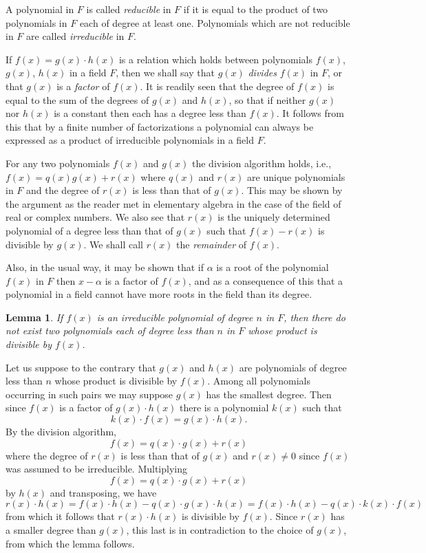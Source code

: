 \documentclass[10pt,leqno]{article}
\newtheorem*{lemm*}{Lemma}
\theoremstyle{definition}
\begin{document}
A polynomial in $F$ is called \emph{reducible} in $F$ if it is equal to the product of two polynomials in $F$ each of degree at least one.
Polynomials which are not reducible in $F$ are called \emph{irreducible} in $F$.

If $f(x) = g(x) \cdot h(x)$ is a relation which holds between polynomials $f(x)$, $g(x)$, $h(x)$ in a field $F$, then we shall say that $g(x)$ \emph{divides} $f(x)$ in $F$, or that $g(x)$ is a \emph{factor} of $f(x)$.
It is readily seen that the degree of $f(x)$ is equal to the sum of the degrees of $g(x)$ and $h(x)$, so that if neither $g(x)$ nor $h(x)$ is a constant then each has a degree less than $f(x)$.
It follows from this that by a finite number of factorizations a polynomial can always be expressed as a product of irreducible polynomials in a field $F$.

For any two polynomials $f(x)$ and $g(x)$ the division algorithm holds, i.e., $f(x) = q(x) g(x) + r(x)$ where $q(x)$ and $r(x)$ are unique polynomials in $F$ and the degree of $r(x)$ is less than that of $g(x)$.
This may be shown by the argument as the reader met in elementary algebra in the case of the field of real or complex numbers.
We also see that $r(x)$ is the uniquely determined polynomial of a degree less than that of $g(x)$ such that $f(x) - r(x)$ is divisible by $g(x)$.
We shall call $r(x)$ the \emph{remainder} of $f(x)$.

Also, in the usual way, it may be shown that if $\alpha$ is a root of the polynomial $f(x)$ in $F$ then $x - \alpha$ is a factor of $f(x)$, and as a consequence of this that a polynomial in a field cannot have more roots in the field than its degree.


\begin{lemm*}
\label{lemm:p24}
If $f(x)$ is an irreducible polynomial of degree $n$ in $F$, then there do not exist two polynomials each of degree less than $n$ in $F$ whose product is divisible by $f(x)$.
\end{lemm*}

Let us suppose to the contrary that $g(x)$ and $h(x)$ are polynomials of degree less than $n$ whose product is divisible by $f(x)$.
Among all polynomials occurring in such pairs we may suppose $g(x)$ has the smallest degree.
Then since $f(x)$ is a factor of $g(x) \cdot h(x)$ there is a polynomial $k(x)$ such that
\[
k(x) \cdot f(x) = g(x) \cdot h(x).
\]
By the division algorithm,
\[
f(x) = q(x) \cdot g(x) + r(x)
\]
where the degree of $r(x)$ is less than that of $g(x)$ and $r(x) \not= 0$ since $f(x)$ was assumed to be irreducible.
Multiplying
\[
f(x) = q(x) \cdot g(x) + r(x)
\]
by $h(x)$ and transposing, we have
\[
r(x) \cdot h(x)
= f(x) \cdot h(x) - q(x) \cdot g(x) \cdot h(x)
= f(x) \cdot h(x) - q(x) \cdot k(x) \cdot f(x)
\]
from which it follows that $r(x) \cdot h(x)$ is divisible by $f(x)$.
Since $r(x)$ has a smaller degree than $g(x)$, this last is in contradiction to the choice of $g(x)$, from which the lemma follows.
\end{document}
